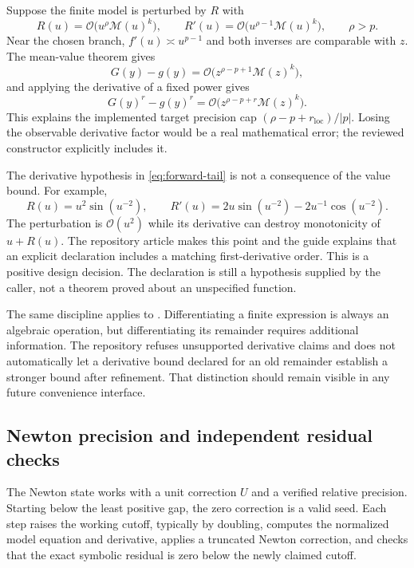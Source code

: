 \documentclass[11pt,a4paper]{article}
\newcommand{\code}[1]{\texttt{\detokenize{#1}}}
\newcommand{\OO}{\mathcal O}
\newcommand{\M}{\mathcal M}
\theoremstyle{definition}
\begin{document}
Suppose the finite model is perturbed by $R$ with
\begin{equation}
 R(u)=\OO\bigl(u^\rho\M(u)^k\bigr),\qquad
 R'(u)=\OO\bigl(u^{\rho-1}\M(u)^k\bigr),\qquad \rho>p.
 \label{eq:forward-tail}
\end{equation}
Near the chosen branch, $f'(u)\asymp u^{p-1}$ and both inverses are comparable with $z$. The mean-value theorem gives
\begin{equation}
 G(y)-g(y)=\OO\bigl(z^{\rho-p+1}\M(z)^k\bigr),
 \label{eq:inverse-tail}
\end{equation}
and applying the derivative of a fixed power gives
\begin{equation}
 G(y)^r-g(y)^r=\OO\bigl(z^{\rho-p+r}\M(z)^k\bigr).
 \label{eq:observable-tail}
\end{equation}
This explains the implemented target precision cap $(\rho-p+r_{\mathrm{loc}})/|p|$. Losing the observable derivative factor would be a real mathematical error; the reviewed constructor explicitly includes it.\cite{transport,core}

The derivative hypothesis in \eqref{eq:forward-tail} is not a consequence of the value bound. For example,
\[
 R(u)=u^2\sin(u^{-2}),\qquad
 R'(u)=2u\sin(u^{-2})-2u^{-1}\cos(u^{-2}).
\]
The perturbation is $\OO(u^2)$ while its derivative can destroy monotonicity of $u+R(u)$. The repository article makes this point and the guide explains that an explicit \code{"InputRemainder" -> {rho,k}} declaration includes a matching first-derivative order. This is a positive design decision. The declaration is still a hypothesis supplied by the caller, not a theorem proved about an unspecified function.\cite{transport,guide}

The same discipline applies to \code{SeriesDifferentiate}. Differentiating a finite expression is always an algebraic operation, but differentiating its remainder requires additional information. The repository refuses unsupported derivative claims and does not automatically let a derivative bound declared for an old remainder establish a stronger bound after refinement. That distinction should remain visible in any future convenience interface.\cite{operations}

\subsection{Newton precision and independent residual checks}

The Newton state works with a unit correction $U$ and a verified relative precision. Starting below the least positive gap, the zero correction is a valid seed. Each step raises the working cutoff, typically by doubling, computes the normalized model equation and derivative, applies a truncated Newton correction, and checks that the exact symbolic residual is zero below the newly claimed cutoff.\cite{incremental}
\end{document}
